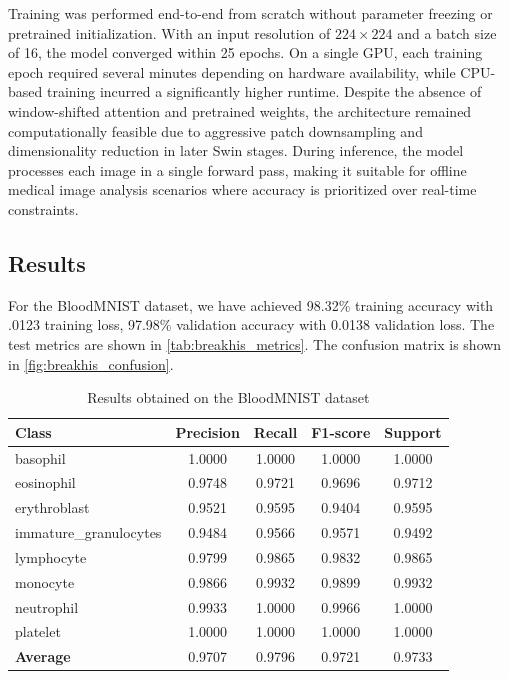 \documentclass[preprint,12pt]{elsarticle}
\begin{document}
Training was performed end-to-end from scratch without parameter freezing or pretrained initialization. With an input resolution of $224 \times 224$ and a batch size of 16, the model converged within 25 epochs. On a single GPU, each training epoch required several minutes depending on hardware availability, while CPU-based training incurred a significantly higher runtime. Despite the absence of window-shifted attention and pretrained weights, the architecture remained computationally feasible due to aggressive patch downsampling and dimensionality reduction in later Swin stages. During inference, the model processes each image in a single forward pass, making it suitable for offline medical image analysis scenarios where accuracy is prioritized over real-time constraints.



\FloatBarrier
\subsection{Results}

For the BloodMNIST dataset, we have achieved 98.32\% training accuracy with .0123 training loss, 97.98\% validation accuracy with 0.0138 validation loss. The test metrics are shown in \autoref{tab:breakhis_metrics}. The confusion matrix is shown in \autoref{fig:breakhis_confusion}.


\begin{table}[h!]
\centering
\caption{Results obtained on the BloodMNIST dataset}
\label{tab:breakhis_metrics}
\begin{tabular}{lcccc}
\hline
\textbf{Class} & \textbf{Precision} & \textbf{Recall} & \textbf{F1-score} & \textbf{Support} \\
\hline
basophil                & 1.0000 & 1.0000 & 1.0000 & 1.0000 \\
eosinophil       & 0.9748 & 0.9721 & 0.9696 & 0.9712 \\
erythroblast      & 0.9521 & 0.9595 & 0.9404 & 0.9595 \\
immature\_granulocytes     & 0.9484 & 0.9566 & 0.9571 & 0.9492 \\
lymphocyte    & 0.9799 & 0.9865 & 0.9832 & 0.9865 \\
monocyte         & 0.9866 & 0.9932 & 0.9899 & 0.9932 \\
neutrophil     & 0.9933 & 1.0000 & 0.9966 & 1.0000 \\
platelet    & 1.0000 & 1.0000 & 1.0000 & 1.0000 \\
\hline
\textbf{Average}   & 0.9707 & 0.9796 & 0.9721 & 0.9733 \\
\hline
\end{tabular}
\end{table}
\end{document}
